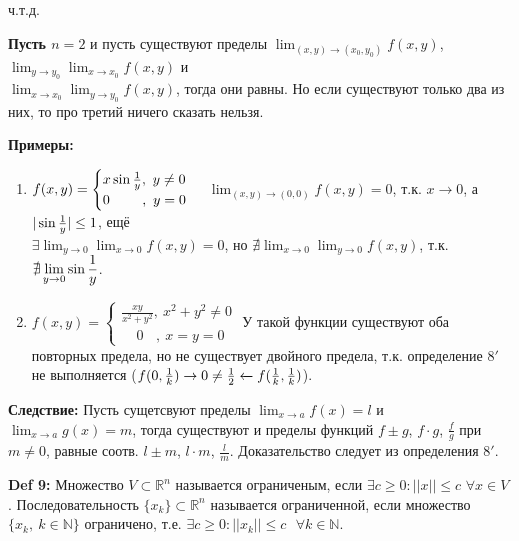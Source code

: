 \documentclass[book, 11pt]{report}
\begin{document}
        \par{{\raggedleft ч.т.д.\par}}
        \vspace{0.6cm}
        \par{\textbf{Пусть $n=2$} и пусть существуют пределы $\displaystyle\lim_{(x,y)\to(x_0,y_0)}f(x,y)$, $\displaystyle\lim_{y\to y_0}\lim_{x\to x_0}f(x,y)$ и \\$\displaystyle\lim_{x\to x_0}\lim_{y\to y_0}f(x,y)$, тогда они равны. Но если существуют только два из них, то про третий ничего сказать нельзя.}
        \newpage
        \par{\textbf{Примеры:}}
        \begin{enumerate}
            \item \par{$f(x,y)=\begin{cases}
                x\sin{1\over y}, \ y\ne0 \\
                0 \ \ \ \ \ \ \ , \ y=0
            \end{cases}$
            $\displaystyle\lim_{(x,y)\to(0,0)}f(x,y)=0$, т.к. $x\to0$, а $|\sin{1\over y}|\leq1$, ещё \\
            $\displaystyle\exists\lim_{y\to0}\lim_{x\to0}f(x,y)=0$, но $\displaystyle\nexists\lim_{x\to0}\lim_{y\to0}f(x,y)$, т.к. $\displaystyle\nexists\lim_{y\to0}\sin{1\over y}$.}
            \item \par{$f(x,y)=\begin{cases}
                \displaystyle\frac{xy}{x^2+y^2}, \ x^2+y^2\ne0 \\
                \ \ \ \ \ 0 \ \ \ \ , \ x=y=0
            \end{cases}$ У такой функции существуют оба повторных предела, но не существует двойного предела, т.к. определение $8'$ не выполняется ($f(0,{1\over k})\to0 \ne {1\over2}\xleftarrow{}f({1\over k}, {1\over k})$).}
        \end{enumerate}
        \vspace{0.6cm}
        \par{\textbf{Следствие: }Пусть сущетсвуют пределы $\displaystyle\lim_{x\to a}f(x)=l$ и $\displaystyle\lim_{x\to a}g(x)=m$, тогда существуют и пределы функций $f\pm g$, $f\cdot g$, $\displaystyle\frac{f}{g}$ при $m\ne0$, равные соотв. $l\pm m$, $l\cdot m$, $\displaystyle\frac{l}{m}$. Доказательство следует из определения $8'$.}
        \vspace{0.7cm}
        \par{\textbf{Def 9: }Множество $V\subset\mathbb{R}^n$ называется ограниченым, если $\exists c\geq0:||x||\leq c$ $\forall x\in V$. Последовательность $\{x_k\}\subset\mathbb{R}^n$ называется ограниченной, если множество $\{x_k, \ k\in\mathbb{N}\}$ ограничено, т.е. $\exists c\geq0: ||x_k||\leq c \ \ \ \forall k\in\mathbb{N}$.}
\end{document}
